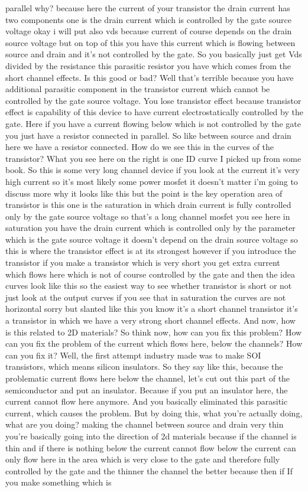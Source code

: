 parallel why? because here the current of your transistor the drain current has two components one is the drain current which is controlled by the gate source voltage okay i will put also vds because current of course depends on the drain source voltage but on top of this you have this current which is flowing between source and drain and it's not controlled by the gate. So you basically just get Vds divided by the resistance this parasitic resistor you have which comes from the short channel effects. Is this good or bad? Well that's terrible because you have additional parasitic component in the transistor current which cannot be controlled by the gate source voltage. You lose transistor effect because transistor effect is capability of this device to have current electrostatically controlled by the gate. Here if you have a current flowing below which is not controlled by the gate you just have a resistor connected in parallel. So like between source and drain here we have a resistor connected. How do we see this in the curves of the transistor? What you see here on the right is one ID curve I picked up from some book. So this is some very long channel device if you look at the current it's very high current so it's most likely some power mosfet it doesn't matter i'm going to discuss more why it looks like this but the point is the key operation area of transistor is this one is the saturation in which drain current is fully controlled only by the gate source voltage so that's a long channel mosfet you see here in saturation you have the drain current which is controlled only by the parameter which is the gate source voltage it doesn't depend on the drain source voltage so this is where the transistor effect is at its strongest however if you introduce the transistor if you make a transistor which is very short you get extra current which flows here which is not of course controlled by the gate and then the idea curves look like this so the easiest way to see whether transistor is short or not just look at the output curves if you see that in saturation the curves are not horizontal sorry but slanted like this you know it's a short channel transistor it's a transistor in which we have a very strong short channel effects. And now, how is this related to 2D materials? So think now, how can you fix this problem? How can you fix the problem of the current which flows here, below the channels? How can you fix it? Well, the first attempt industry made was to make SOI transistors, which means silicon insulators. So they say like this, because the problematic current flows here below the channel, let's cut out this part of the semiconductor and put an insulator. Because if you put an insulator here, the current cannot flow here anymore. And you basically eliminated this parasitic current, which causes the problem. But by doing this, what you're actually doing, what are you doing? making the channel between source and drain very thin you're basically going into the direction of 2d materials because if the channel is thin and if there is nothing below the current cannot flow below the current can only flow here in the area which is very close to the gate and therefore fully controlled by the gate and the thinner the channel the better because then if If you make something which is 